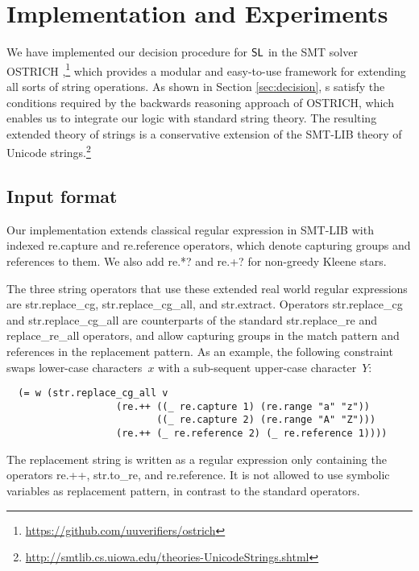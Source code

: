 
\section{Implementation and Experiments}
\label{sect:impl}

We have implemented our decision procedure for $\mathsf{SL}$ in the SMT
solver OSTRICH
\cite{CHL+19},\footnote{\url{https://github.com/uuverifiers/ostrich}}
which provides a modular and easy-to-use framework for extending all
sorts of string operations. As shown in Section \ref{sec:decision},
\PSST s satisfy the conditions required by the backwards reasoning
approach of OSTRICH, which enables us to integrate our logic with
standard string theory. The resulting extended theory of strings is a
conservative extension of the SMT-LIB theory of Unicode
strings.\footnote{\url{http://smtlib.cs.uiowa.edu/theories-UnicodeStrings.shtml}}

\subsection{Input format}

Our implementation extends classical regular expression in SMT-LIB
with indexed {\sf re.capture} and {\sf re.reference} operators, which
denote capturing groups and references to them. We also add {\sf re.*?}
and {\sf re.+?} for non-greedy Kleene stars.

The three string operators that use these extended real world regular
expressions are {\sf str.replace\_cg}, {\sf str.replace\_cg\_all}, and
{\sf str.extract}. Operators {\sf str.replace\_cg} and {\sf
  str.replace\_cg\_all} are counterparts of the standard {\sf
  str.replace\_re} and {\sf replace\_re\_all} operators, and allow
capturing groups in the match pattern and references in the
replacement pattern. As an example, the following constraint swaps
lower-case characters~$x$ with a sub-sequent upper-case character~$Y$:
%
\begin{verbatim}
  (= w (str.replace_cg_all v
                   (re.++ ((_ re.capture 1) (re.range "a" "z"))
                          ((_ re.capture 2) (re.range "A" "Z")))
                   (re.++ (_ re.reference 2) (_ re.reference 1))))
\end{verbatim}
%
The replacement string is written as a regular expression only
containing the operators {\sf re.++}, {\sf str.to\_re}, and {\sf
  re.reference}. It is not allowed to use symbolic variables as
replacement pattern, in contrast to the standard operators.

